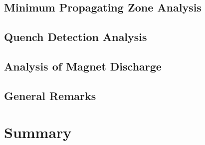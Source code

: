 \documentclass[11pt,a4paper]{report}
\begin{document}
\section{Minimum Propagating Zone Analysis}


\section{Quench Detection Analysis}


\section{Analysis of Magnet Discharge}


\section{General Remarks}


\clearpage
\chapter{Summary}
\label{chapter:research_questions_discussions}

\end{document}
